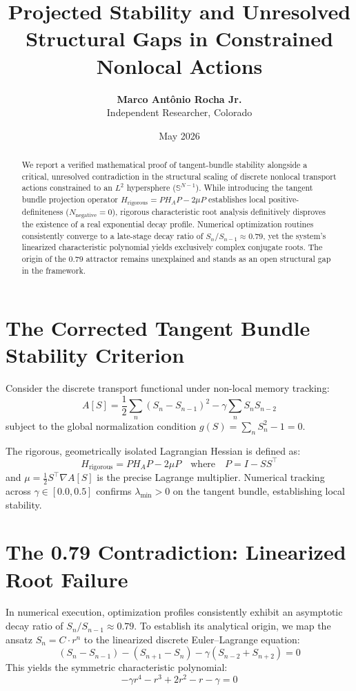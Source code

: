 \documentclass[11pt,a4paper]{article}
\title{\textbf{Projected Stability and Unresolved Structural Gaps in Constrained Nonlocal Actions}}
\author{\textbf{Marco Antônio Rocha Jr.}\\ \small{Independent Researcher, Colorado}}
\date{May 2026}
\begin{document}
\maketitle

\begin{abstract}
We report a verified mathematical proof of tangent-bundle stability alongside a critical, unresolved contradiction in the structural scaling of discrete nonlocal transport actions constrained to an $L^2$ hypersphere ($\mathbb{S}^{N-1}$). While introducing the tangent bundle projection operator $H_{\mathrm{rigorous}} = P H_A P - 2\mu P$ establishes local positive-definiteness ($N_{\mathrm{negative}} = 0$), rigorous characteristic root analysis definitively disproves the existence of a real exponential decay profile. Numerical optimization routines consistently converge to a late-stage decay ratio of $S_n / S_{n-1} \approx 0.79$, yet the system's linearized characteristic polynomial yields exclusively complex conjugate roots. The origin of the $0.79$ attractor remains unexplained and stands as an open structural gap in the framework.
\end{abstract}

\section{The Corrected Tangent Bundle Stability Criterion}
Consider the discrete transport functional under non-local memory tracking:
\begin{equation}
A[S] = \frac{1}{2} \sum_{n} (S_n - S_{n-1})^2 - \gamma \sum_{n} S_n S_{n-2}
\end{equation}
subject to the global normalization condition $g(S) = \sum_n S_n^2 - 1 = 0$.

The rigorous, geometrically isolated Lagrangian Hessian is defined as:
\begin{equation}
H_{\mathrm{rigorous}} = P H_A P - 2\mu P \quad \text{where} \quad P = I - S S^\top
\end{equation}
and $\mu = \frac{1}{2} S^\top \nabla A[S]$ is the precise Lagrange multiplier. Numerical tracking across $\gamma \in [0.0, 0.5]$ confirms $\lambda_{\min} > 0$ on the tangent bundle, establishing local stability.

\section{The 0.79 Contradiction: Linearized Root Failure}
In numerical execution, optimization profiles consistently exhibit an asymptotic decay ratio of $S_n / S_{n-1} \approx 0.79$. To establish its analytical origin, we map the ansatz $S_n = C \cdot r^n$ to the linearized discrete Euler--Lagrange equation:
\begin{equation}
(S_n - S_{n-1}) - (S_{n+1} - S_n) - \gamma(S_{n-2} + S_{n+2}) = 0
\end{equation}
This yields the symmetric characteristic polynomial:
\begin{equation}
-\gamma r^4 - r^3 + 2r^2 - r - \gamma = 0
\end{equation}
\end{document}
